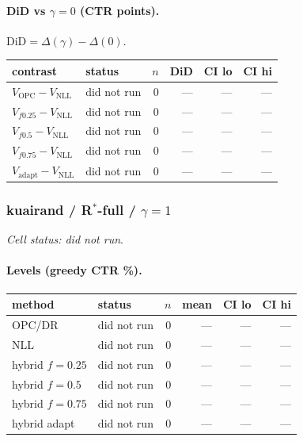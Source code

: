 \documentclass[10pt,a4paper]{article}
\begin{document}
\paragraph{DiD vs $\gamma=0$ (CTR points).} $\mathrm{DiD}=\Delta(\gamma)-\Delta(0)$.
{\centering\small\begin{tabular}{llrrrr}
\toprule contrast & status & $n$ & DiD & CI lo & CI hi \\
\midrule
$V_{\mathrm{OPC}}-V_{\mathrm{NLL}}$ & did not run & 0 & --- & --- & --- \\
$V_{f0.25}-V_{\mathrm{NLL}}$ & did not run & 0 & --- & --- & --- \\
$V_{f0.5}-V_{\mathrm{NLL}}$ & did not run & 0 & --- & --- & --- \\
$V_{f0.75}-V_{\mathrm{NLL}}$ & did not run & 0 & --- & --- & --- \\
$V_{\mathrm{adapt}}-V_{\mathrm{NLL}}$ & did not run & 0 & --- & --- & --- \\
\bottomrule\end{tabular}\par}
\bigskip
\subsubsection{kuairand / R$^*$-full / $\gamma=1$}
\emph{Cell status: did not run}.
\paragraph{Levels (greedy CTR \%).}
{\centering\small\begin{tabular}{llrrrr}
\toprule method & status & $n$ & mean & CI lo & CI hi \\
\midrule
OPC/DR & did not run & 0 & --- & --- & --- \\
NLL & did not run & 0 & --- & --- & --- \\
hybrid $f{=}0.25$ & did not run & 0 & --- & --- & --- \\
hybrid $f{=}0.5$ & did not run & 0 & --- & --- & --- \\
hybrid $f{=}0.75$ & did not run & 0 & --- & --- & --- \\
hybrid adapt & did not run & 0 & --- & --- & --- \\
\bottomrule\end{tabular}\par}
\end{document}
